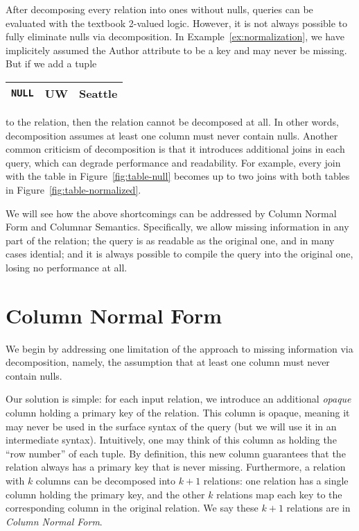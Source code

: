 \documentclass[sigconf]{acmart}
\begin{document}
After decomposing every relation into ones without nulls,
 queries can be evaluated with the textbook 2-valued logic.
However, it is not always possible to fully eliminate nulls via decomposition.
In Example~\ref{ex:normalization}, 
 we have implicitely assumed the \textsf{Author} attribute 
 to be a key and may never be missing.
But if we add a tuple 
%
\begin{tabular}{|c|c|c|}
\hline
\lstinline|NULL| & UW & Seattle\\
\hline
\end{tabular}
%
 to the relation, 
 then the relation cannot be decomposed at all.
In other words, decomposition assumes at least one column must never contain nulls. 
Another common criticism of decomposition is that
 it introduces additional joins in each query, 
 which can degrade performance and readability.
For example, every join with the table in Figure~\ref{fig:table-null}
 becomes up to two joins with both tables in Figure~\ref{fig:table-normalized}.

We will see how the above shortcomings can be addressed 
 by Column Normal Form and Columnar Semantics.
Specifically, we allow missing information in any part of the relation;
 the query is as readable as the original one, and in many cases idential;
 and it is always possible to compile the query into the original one,
 losing no performance at all.

\section{Column Normal Form}
\label{sec:cnf}

We begin by addressing one limitation of the approach
 to missing information via decomposition,
 namely, the assumption that at least one column must never contain nulls.

Our solution is simple:
 for each input relation, 
 we introduce an additional {\em opaque} column 
 holding a primary key of the relation.
This column is opaque, meaning it may never be used 
 in the surface syntax of the query 
 (but we will use it in an intermediate syntax).
Intuitively, one may think of this column as holding 
 the ``row number'' of each tuple.
By definition, this new column guarantees
 that the relation always has a primary key that is never missing.
Furthermore, a relation with $k$ columns can be decomposed
 into $k+1$ relations:
 one relation has a single column holding the primary key,
 and the other $k$ relations 
 map each key to the corresponding column in the original relation.
We say these $k+1$ relations are in {\em Column Normal Form}.
\end{document}
